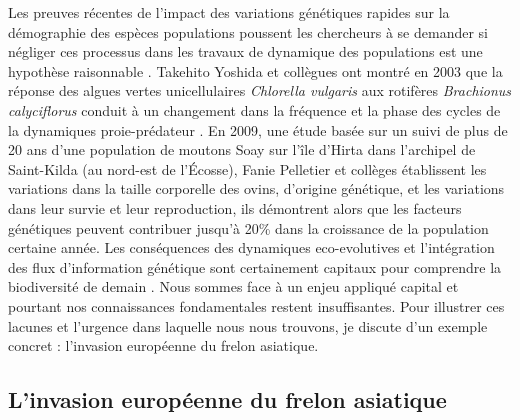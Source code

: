 Les preuves récentes de l'impact des variations génétiques rapides sur
la démographie des espèces populations poussent les chercheurs à se
demander si négliger ces processus dans les travaux de dynamique des
populations est une hypothèse raisonnable
\citep{Pelletier2009, Post2009, Schoener2011}. Takehito Yoshida et
collègues ont montré en 2003 que la réponse des algues vertes
unicellulaires \emph{Chlorella vulgaris} aux rotifères \emph{Brachionus
calyciflorus} conduit à un changement dans la fréquence et la phase des
cycles de la dynamiques proie-prédateur \citep{Yoshida2003}. En 2009,
une étude basée sur un suivi de plus de 20 ans d'une population de
moutons Soay sur l'île d'Hirta dans l'archipel de Saint-Kilda (au
nord-est de l'Écosse), Fanie Pelletier et collèges établissent les
variations dans la taille corporelle des ovins, d'origine génétique, et
les variations dans leur survie et leur reproduction, ils démontrent
alors que les facteurs génétiques peuvent contribuer jusqu'à 20\% dans
la croissance de la population certaine année. Les conséquences des
dynamiques eco-evolutives et l'intégration des flux d'information
génétique sont certainement capitaux pour comprendre la biodiversité de
demain \citep{Sexton2009, Lavergne2010}. Nous sommes face à un enjeu
appliqué capital et pourtant nos connaissances fondamentales restent
insuffisantes. Pour illustrer ces lacunes et l'urgence dans laquelle
nous nous trouvons, je discute d'un exemple concret : l'invasion
européenne du frelon asiatique.

\subsection*{L'invasion européenne du frelon
asiatique}\label{linvasion-europuxe9enne-du-frelon-asiatique}

